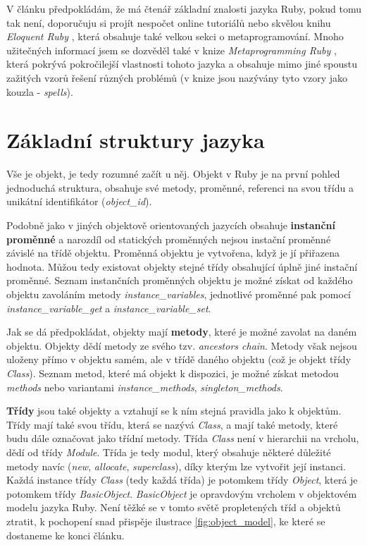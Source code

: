 \documentclass[12pt,a4paper,oneside]{article}
\begin{document}
V článku předpokládám, že má čtenář základní znalosti jazyka Ruby, pokud tomu tak není, doporučuju si projít nespočet online tutoriálů nebo skvělou knihu {\it Eloquent Ruby} \cite{olsen2011eloquent}, která obsahuje také velkou sekci o metaprogramování. Mnoho užitečných informací jsem se dozvěděl také v knize {\it Metaprogramming Ruby} \cite{metaRuby}, která pokrývá pokročilejší vlastnosti tohoto jazyka a obsahuje mimo jiné spoustu zažitých vzorů řešení různých problémů (v knize jsou nazývány tyto vzory jako kouzla - \emph{spells}).


\section{Základní struktury jazyka}

Vše je objekt, je tedy rozumné začít u něj. Objekt v Ruby je na první pohled jednoduchá struktura, obsahuje své metody, proměnné, referenci na svou třídu a unikátní identifikátor (\emph{object\_id}).

Podobně jako v jiných objektově orientovaných jazycích obsahuje \textbf{instanční proměnné} a narozdíl od statických proměnných nejsou instační proměnné závislé na třídě objektu. Proměnná objektu je vytvořena, když je jí přiřazena hodnota. Můžou tedy existovat objekty stejné třídy obsahující úplně jiné instační proměnné. Seznam instančních proměnných objektu je možné získat od každého objektu zavoláním metody \emph{instance\_variables}, jednotlivé proměnné pak pomocí \emph{instance\_variable\_get} a \emph{instance\_variable\_set}.

Jak se dá předpokládat, objekty mají \textbf{metody}, které je možné zavolat na daném objektu. Objekty dědí metody ze svého tzv. \emph{ancestors chain}. Metody však nejsou uloženy přímo v objektu samém, ale v třídě daného objektu (což je objekt třídy \emph{Class}). Seznam metod, které má objekt k dispozici, je možné získat metodou \emph{methods} nebo variantami \emph{instance\_methods}, \emph{singleton\_methods}.

\textbf{Třídy} jsou také objekty a vztahují se k ním stejná pravidla jako k objektům. Třídy mají také svou třídu, která se nazývá \emph{Class}, a mají také metody, které budu dále označovat jako třídní metody. Třída \emph{Class} není v hierarchii na vrcholu, dědí od třídy \emph{Module}. Třída je tedy modul, který obsahuje některé důležité metody navíc (\emph{new}, \emph{allocate}, \emph{superclass}), díky kterým lze vytvořit její instanci. Každá instance třídy \emph{Class} (tedy každá třída) je potomkem třídy \emph{Object}, která je potomkem třídy \emph{BasicObject}. \emph{BasicObject} je opravdovým vrcholem v objektovém modelu jazyka Ruby. Není těžké se v tomto světě propletených tříd a objektů ztratit, k pochopení snad přispěje ilustrace \ref{fig:object_model}, ke které se dostaneme ke konci článku.
\end{document}
